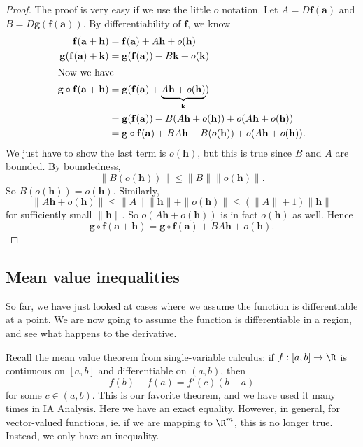 \documentclass[a4paper]{article}
\begin{document}
\begin{proof}
  The proof is very easy if we use the little $o$ notation. Let $A = D\mathbf{f}(\mathbf{a})$ and $B = D \mathbf{g}(\mathbf{f}(\mathbf{a}))$. By differentiability of $\mathbf{f}$, we know
  \begin{align*}
    \mathbf{f}(\mathbf{a} + \mathbf{h}) &= \mathbf{f}(\mathbf{a}) + A \mathbf{h} + o(\mathbf{h})\\
    \mathbf{g}(\mathbf{f}(\mathbf{a}) + \mathbf{k}) &= \mathbf{g}(\mathbf{f}(\mathbf{a})) + B\mathbf{k} + o(\mathbf{k})\\
    \intertext{Now we have}
    \mathbf{g}\circ \mathbf{f}(\mathbf{a} + \mathbf{h}) &= \mathbf{g}(\mathbf{f}(\mathbf{a}) + \underbrace{A \mathbf{h} + o(\mathbf{h})}_{\mathbf{k}})\\
    &= \mathbf{g}(\mathbf{f}(\mathbf{a})) + B(A \mathbf{h} + o(\mathbf{h})) + o(A \mathbf{h} + o(\mathbf{h}))\\
    &= \mathbf{g}\circ \mathbf{f}(\mathbf{a}) + B A \mathbf{h} + B(o(\mathbf{h})) + o(A \mathbf{h} + o(\mathbf{h})).
  \end{align*}
  We just have to show the last term is $o(\mathbf{h})$, but this is true since $B$ and $A$ are bounded. By boundedness,
  \[
    \|B(o(\mathbf{h}))\| \leq \|B\|\|o (\mathbf{h})\|.
  \]
  So $B(o(\mathbf{h})) = o(\mathbf{h})$. Similarly,
  \[
    \|A\mathbf{h} + o(\mathbf{h})\| \leq \|A\| \|\mathbf{h}\| + \|o (\mathbf{h})\| \leq (\|A\| + 1)\|\mathbf{h}\|
  \]
  for sufficiently small $\|\mathbf{h}\|$. So $o(A \mathbf{h} + o(\mathbf{h}))$ is in fact $o(\mathbf{h})$ as well. Hence
  \[
    \mathbf{g}\circ \mathbf{f}(\mathbf{a} + \mathbf{h}) = \mathbf{g} \circ \mathbf{f}(\mathbf{a}) + BA \mathbf{h} + o(\mathbf{h}).
  \]
\end{proof}

\subsection{Mean value inequalities}
So far, we have just looked at cases where we assume the function is differentiable at a point. We are now going to assume the function is differentiable in a region, and see what happens to the derivative.

Recall the mean value theorem from single-variable calculus: if $f: [a, b] \to \R$ is continuous on $[a, b]$ and differentiable on $(a, b)$, then
\[
  f(b) - f(a) = f'(c) (b - a)
\]
for some $c \in (a, b)$. This is our favorite theorem, and we have used it many times in IA Analysis. Here we have an exact equality. However, in general, for vector-valued functions, ie. if we are mapping to $\R^m$, this is no longer true. Instead, we only have an inequality.
\end{document}
